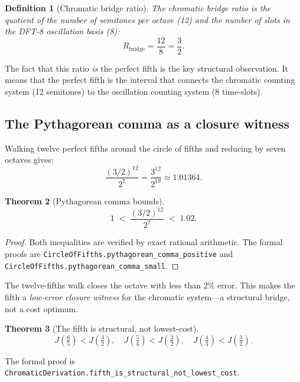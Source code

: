 \documentclass[11pt,a4paper]{article}
\newtheorem{theorem}{Theorem}
\newtheorem{definition}[theorem]{Definition}
\begin{document}
\begin{definition}[Chromatic bridge ratio]
\label{def:bridge}
The \emph{chromatic bridge ratio} is the quotient of the number of
semitones per octave (12) and the number of slots in the DFT-8
oscillation basis (8):
\[
  R_{\mathrm{bridge}} = \frac{12}{8} = \frac{3}{2}.
\]
\end{definition}

\noindent The fact that this ratio \emph{is} the perfect fifth is
the key structural observation.  It means that the perfect fifth is
the interval that connects the chromatic counting system (12 semitones)
to the oscillation counting system (8 time-slots).

\subsection{The Pythagorean comma as a closure witness}

Walking twelve perfect fifths around the circle of fifths and reducing
by seven octaves gives:
\begin{equation}
  \label{eq:comma}
  \frac{(3/2)^{12}}{2^7} = \frac{3^{12}}{2^{19}} \approx 1.01364.
\end{equation}

\begin{theorem}[Pythagorean comma bounds]
\label{thm:comma}
\[
  1 \;<\; \frac{(3/2)^{12}}{2^7} \;<\; 1.02.
\]
\end{theorem}

\begin{proof}
Both inequalities are verified by exact rational arithmetic.  The
formal proofs are \texttt{CircleOfFifths.pythagorean\_comma\_positive}
and \texttt{CircleOfFifths.pythagorean\_comma\_small}.
\end{proof}

\noindent The twelve-fifths walk closes the octave with less than 2\%
error.  This makes the fifth a \emph{low-error closure witness} for
the chromatic system---a structural bridge, not a cost optimum.

\begin{theorem}[The fifth is structural, not lowest-cost]
\label{thm:fifth-not-lowest}
\[
  J\!\left(\tfrac{6}{5}\right) < J\!\left(\tfrac{3}{2}\right),\quad
  J\!\left(\tfrac{5}{4}\right) < J\!\left(\tfrac{3}{2}\right),\quad
  J\!\left(\tfrac{4}{3}\right) < J\!\left(\tfrac{3}{2}\right).
\]
\end{theorem}

\noindent The formal proof is
\texttt{ChromaticDerivation.fifth\_is\_structural\_not\_lowest\_cost}.
\end{document}
